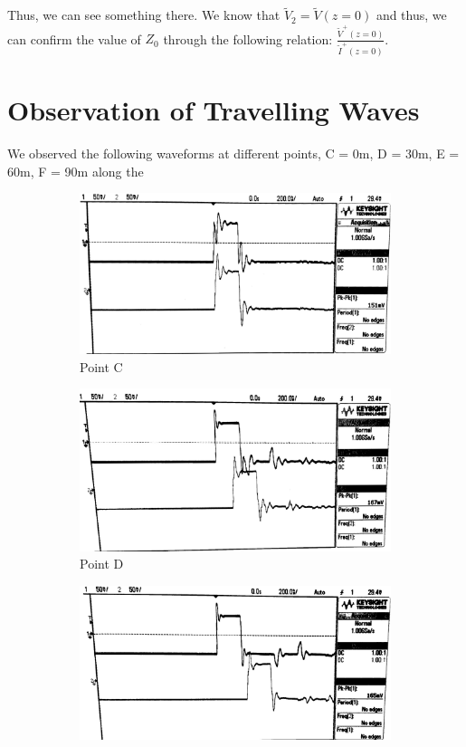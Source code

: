\documentclass[10pt]{article}
\begin{document}
Thus, we can see something there. We know that $\tilde V_2 = \tilde V(z=0)$ and thus, we can confirm the
value of $Z_0$ through the following relation: $\frac{\tilde V^+(z=0)}{\tilde I^+(z=0)}$.

\section{Observation of Travelling Waves}

We observed the following waveforms at different points, C = 0m, D = 30m, E = 60m, F = 90m along the 

\begin{figure} [h]
    \centering
    \begin{subfigure}[b]{0.35\textwidth}
        \includegraphics[width=\textwidth]{../photos/lab1/v_t_pt_c.jpg}
        \caption{Point C}
    \end{subfigure}
    \begin{subfigure}[b]{0.35\textwidth}
        \includegraphics[width=\textwidth]{../photos/lab1/v_t_pt_d.jpg}
        \caption{Point D}
    \end{subfigure}
    \begin{subfigure}[b]{0.35\textwidth}
        \includegraphics[width=\textwidth]{../photos/lab1/v_t_pt_e.jpg}

\end{subfigure}
\end{figure}
\end{document}

